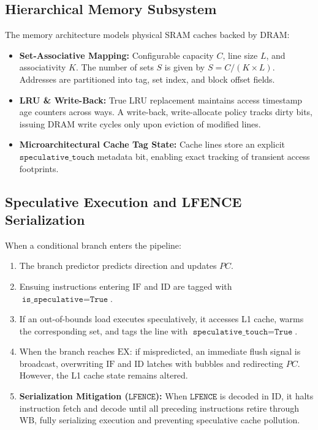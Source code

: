 \documentclass[journal,twocolumn,10pt]{IEEEtran}
\begin{document}
\subsection{Hierarchical Memory Subsystem}
The memory architecture models physical SRAM caches backed by DRAM:
\begin{itemize}
    \item \textbf{Set-Associative Mapping:} Configurable capacity $C$, line size $L$, and associativity $K$. The number of sets $S$ is given by $S = C / (K \times L)$. Addresses are partitioned into tag, set index, and block offset fields.
    \item \textbf{LRU \& Write-Back:} True LRU replacement maintains access timestamp age counters across ways. A write-back, write-allocate policy tracks dirty bits, issuing DRAM write cycles only upon eviction of modified lines.
    \item \textbf{Microarchitectural Cache Tag State:} Cache lines store an explicit $\texttt{speculative\_touch}$ metadata bit, enabling exact tracking of transient access footprints.
\end{itemize}

\subsection{Speculative Execution and LFENCE Serialization}
When a conditional branch enters the pipeline:
\begin{enumerate}
    \item The branch predictor predicts direction and updates $PC$.
    \item Ensuing instructions entering $\text{IF}$ and $\text{ID}$ are tagged with $\texttt{is\_speculative} = \texttt{True}$.
    \item If an out-of-bounds load executes speculatively, it accesses L1 cache, warms the corresponding set, and tags the line with $\texttt{speculative\_touch} = \texttt{True}$.
    \item When the branch reaches $\text{EX}$: if mispredicted, an immediate flush signal is broadcast, overwriting $\text{IF}$ and $\text{ID}$ latches with bubbles and redirecting $PC$. However, the L1 cache state remains altered.
    \item \textbf{Serialization Mitigation ($\texttt{LFENCE}$):} When $\texttt{LFENCE}$ is decoded in $\text{ID}$, it halts instruction fetch and decode until all preceding instructions retire through $\text{WB}$, fully serializing execution and preventing speculative cache pollution.
\end{enumerate}
\end{document}
